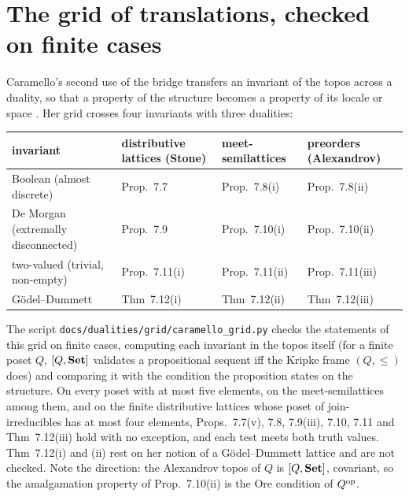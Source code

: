 \documentclass[11pt]{article}
\begin{document}
\section{The grid of translations, checked on finite cases}\label{sec:grid}
Caramello's second use of the bridge transfers an invariant of the topos across a duality, so that a
property of the structure becomes a property of its locale or space \cite[\S7.3]{caramello-stone}.
Her grid crosses four invariants with three dualities:
\begin{center}\small
\begin{tabularx}{\linewidth}{@{}>{\raggedright\arraybackslash}X>{\raggedright\arraybackslash}p{2.6cm}>{\raggedright\arraybackslash}p{2.4cm}>{\raggedright\arraybackslash}p{2.4cm}@{}}
\toprule
invariant & distributive lattices (Stone) & meet-semi\-lattices & preorders (Alexandrov)\\
\midrule
Boolean (almost discrete) & Prop.~7.7 & Prop.~7.8(i) & Prop.~7.8(ii)\\
De Morgan (extremally disconnected) & Prop.~7.9 & Prop.~7.10(i) & Prop.~7.10(ii)\\
two-valued (trivial, non-empty) & Prop.~7.11(i) & Prop.~7.11(ii) & Prop.~7.11(iii)\\
Gödel--Dummett & Thm~7.12(i) & Thm~7.12(ii) & Thm~7.12(iii)\\
\bottomrule
\end{tabularx}
\end{center}
The script \nolinkurl{docs/dualities/grid/caramello_grid.py} checks the statements of this grid on
finite cases, computing each invariant in the topos itself (for a finite poset $Q$, $[Q,\mathbf{Set}]$
validates a propositional sequent iff the Kripke frame $(Q,\le)$ does) and comparing it with the
condition the proposition states on the structure. On every poset with at most five elements, on
the meet-semilattices among them, and on the finite distributive lattices whose poset of
join-irreducibles has at most four elements, Props.~7.7(v), 7.8, 7.9(iii), 7.10, 7.11 and
Thm~7.12(iii) hold with no exception, and each test meets both truth values. Thm~7.12(i) and (ii)
rest on her notion of a Gödel--Dummett lattice and are not checked. Note the direction: the
Alexandrov topos of $Q$ is $[Q,\mathbf{Set}]$, covariant, so the amalgamation property of Prop.~7.10(ii)
is the Ore condition of $Q^{\mathrm{op}}$.
\end{document}
